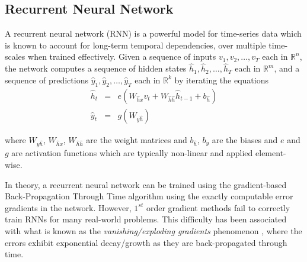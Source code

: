 	\subsection{Recurrent Neural Network}
	\label{subsec:rnn}
	A recurrent neural network (RNN) is a powerful model for time-series data which is known to account for long-term temporal dependencies, over multiple time-scales when trained effectively. 
	Given a sequence of inputs $v_1, v_2, \ldots, v_T$ each in $\mathbb{R}^n$, the network computes a sequence of hidden states $\hat{h}_1, \hat{h}_2, \ldots, \hat{h}_T$ each in $\mathbb{R}^m$, and a sequence of predictions $\hat{y}_1, \hat{y}_2, \ldots, \hat{y}_T$ each in $\mathbb{R}^k$ by iterating the equations
	\begin{eqnarray}
		\hat{h}_{t} & = & e(W_{\hat{h}x} v_t + W_{\hat{h}\hat{h}} \hat{h}_{t-1} + b_{\hat{h}}) \\
		\hat{y}_t & = & g(W_{y\hat{h}})
	\end{eqnarray}
	
	where $W_{y\hat{h}}$, $W_{\hat{h}x}$, $W_{\hat{h}\hat{h}}$ are the weight matrices and $b_{\hat{h}}$, $b_y$ are the biases and $e$ and $g$ are activation functions which are typically non-linear and applied element-wise. %
	
	In theory, a recurrent neural network can be trained using the gradient-based Back-Propagation Through Time algorithm \cite{Werbos1990} using the exactly computable error gradients in the network. However, $1^{st}$ order gradient methods fail to correctly train RNNs for many real-world problems. This difficulty has been associated with what is known as the \textit{vanishing/exploding gradients} phenomenon \cite{Bengio1994}, where the errors exhibit exponential decay/growth as they are back-propagated through time. %

